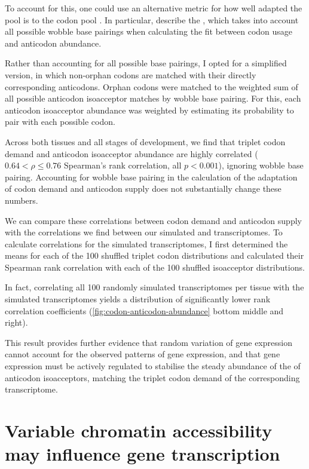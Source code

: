 To account for this, one could use an alternative metric for how well adapted
the \trna pool is to the codon pool \citep{Gingold:2011}. In particular,
\citet{Dos_Reis:2004} describe the \tai, which takes into account all possible
wobble base pairings when calculating the fit between codon usage and anticodon
abundance.

Rather than accounting for all possible base pairings, I opted for a simplified
version, in which non-orphan codons are matched with their directly
corresponding anticodons. Orphan codons were matched to the weighted sum of all
possible \trna anticodon isoacceptor matches by wobble base pairing. For this,
each anticodon isoacceptor abundance was weighted by estimating its probability
to pair with each possible codon.

Across both tissues and all stages of development, we find that \mrna triplet
codon demand and \trna anticodon isoacceptor abundance are highly correlated
(\(0.64 < \rho \leq 0.76\) Spearman’s rank correlation, all \(p < 0.001\)),
ignoring wobble base pairing. Accounting for wobble base pairing in the
calculation of the adaptation of codon demand and anticodon supply does not
substantially change these numbers.

We can compare these correlations between \mrna codon demand and \trna anticodon
supply with the correlations we find between our simulated \mrna and \trna
transcriptomes. To calculate correlations for the simulated transcriptomes, I
first determined the means for each of the \num{100} shuffled triplet codon
distributions and calculated their Spearman rank correlation with each of the
\num{100} shuffled isoacceptor distributions.

In fact, correlating all \num{100} randomly simulated \trna
transcriptomes per tissue with the simulated \mrna transcriptomes yields a
distribution of significantly lower rank correlation coefficients
(\cref{fig:codon-anticodon-abundance} bottom middle and right).

This result provides further evidence that random variation of \trna gene
expression cannot account for the observed patterns of \trna gene expression,
and that \trna gene expression must be actively regulated to stabilise the
steady abundance of the of \trna anticodon isoacceptors, matching the triplet
codon demand of the corresponding \mrna transcriptome.

\section{Variable chromatin accessibility may influence  gene
transcription}

